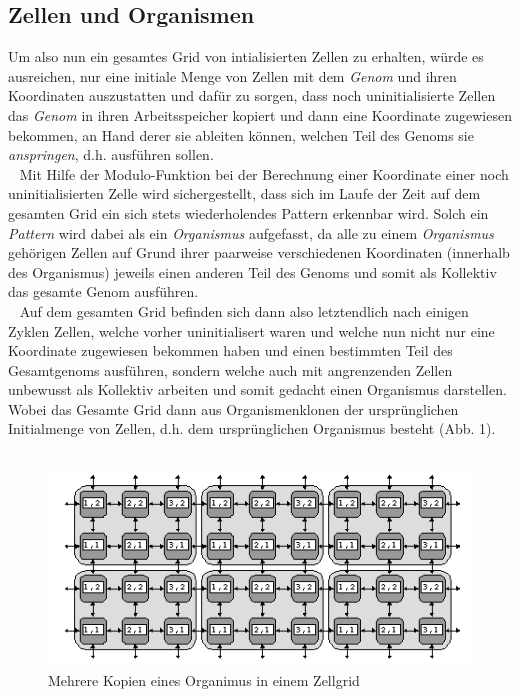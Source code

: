 \documentclass[12p, a4]{article}
\begin{document}
\subsection{Zellen und Organismen}
Um also nun ein gesamtes Grid von intialisierten Zellen zu erhalten, würde es
ausreichen, nur eine initiale Menge von Zellen mit dem \textit{Genom} und
ihren Koordinaten auszustatten und dafür zu sorgen, dass noch uninitialisierte
Zellen das \textit{Genom} in ihren Arbeitsspeicher kopiert und dann
eine Koordinate zugewiesen bekommen, an Hand derer sie ableiten können,
welchen Teil des Genoms sie \textit{anspringen}, d.h. ausführen sollen.\\
\ \newline
Mit Hilfe der Modulo-Funktion bei der Berechnung einer Koordinate einer noch
uninitialisierten Zelle wird sichergestellt, dass sich im Laufe der Zeit
auf dem gesamten Grid ein sich stets wiederholendes Pattern erkennbar wird.
Solch ein \textit{Pattern} wird dabei als ein \textit{Organismus}
aufgefasst, da alle zu einem \textit{Organismus} gehörigen Zellen auf Grund
ihrer paarweise verschiedenen Koordinaten (innerhalb des Organismus) jeweils
einen anderen Teil des Genoms und somit als Kollektiv das gesamte
Genom ausführen.\\
\ \newline
Auf dem gesamten Grid befinden sich dann also letztendlich nach einigen Zyklen
Zellen, welche vorher uninitialisert waren und welche nun nicht
nur eine Koordinate zugewiesen bekommen haben und einen bestimmten Teil des
Gesamtgenoms ausführen, sondern welche auch mit angrenzenden Zellen unbewusst
als Kollektiv arbeiten und somit gedacht einen Organismus darstellen. Wobei
das Gesamte Grid dann aus Organismenklonen der ursprünglichen Initialmenge von
Zellen, d.h. dem ursprünglichen Organismus besteht (Abb. 1).\\
\ \newline
\begin{figure}[h]
  \centering
    \includegraphics[width=\linewidth]{cell_coords2.png}
  \caption{Mehrere Kopien eines Organimus in einem Zellgrid}
  \label{}
\end{figure}
\end{document}
